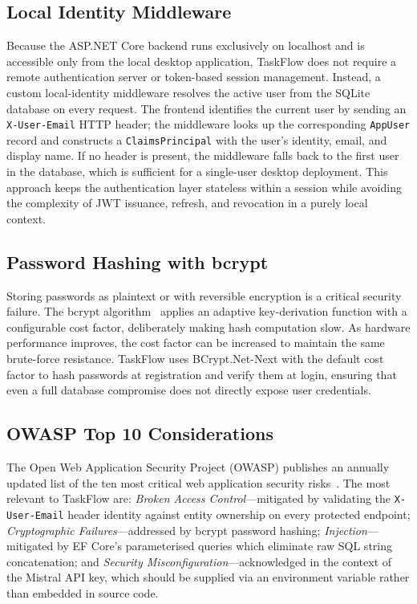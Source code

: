 \subsection*{Local Identity Middleware}

Because the ASP.NET Core backend runs exclusively on localhost and is
accessible only from the local desktop application, TaskFlow does not
require a remote authentication server or token-based session management.
Instead, a custom local-identity middleware resolves the active user from
the SQLite database on every request.
The frontend identifies the current user by sending an \texttt{X-User-Email}
HTTP header; the middleware looks up the corresponding \texttt{AppUser}
record and constructs a \texttt{ClaimsPrincipal} with the user's identity,
email, and display name.
If no header is present, the middleware falls back to the first user in the
database, which is sufficient for a single-user desktop deployment.
This approach keeps the authentication layer stateless within a session
while avoiding the complexity of JWT issuance, refresh, and revocation in
a purely local context.

\subsection*{Password Hashing with bcrypt}

Storing passwords as plaintext or with reversible encryption is a critical security
failure.
The bcrypt algorithm~\cite{provos1999bcrypt} applies an adaptive key-derivation function
with a configurable cost factor, deliberately making hash computation slow.
As hardware performance improves, the cost factor can be increased to maintain the same
brute-force resistance.
TaskFlow uses BCrypt.Net-Next with the default cost factor to hash passwords at
registration and verify them at login, ensuring that even a full database compromise
does not directly expose user credentials.

\subsection*{OWASP Top 10 Considerations}

The Open Web Application Security Project (OWASP) publishes an annually updated list of
the ten most critical web application security risks~\cite{owasp2021}.
The most relevant to TaskFlow are:
\emph{Broken Access Control}---mitigated by validating the \texttt{X-User-Email}
header identity against entity ownership on every protected endpoint;
\emph{Cryptographic Failures}---addressed by bcrypt password hashing;
\emph{Injection}---mitigated by EF Core's parameterised queries which eliminate raw SQL
string concatenation; and
\emph{Security Misconfiguration}---acknowledged in the context of the Mistral API key,
which should be supplied via an environment variable rather than embedded in source code.

